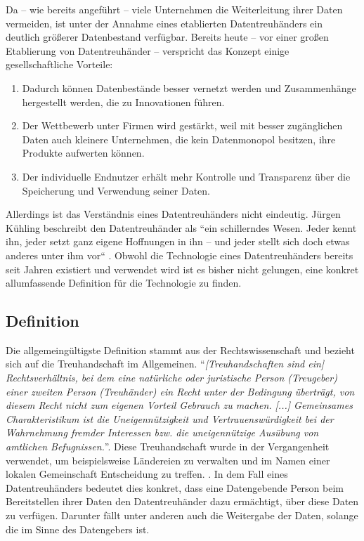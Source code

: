 \documentclass[
	fontsize=12pt,
	headings=small,
	parskip=half,           %
	bibliography=totoc,
	numbers=noenddot,       %
	open=any,               %
]{scrreprt}
\begin{document}
Da -- wie bereits angeführt -- viele Unternehmen die Weiterleitung ihrer Daten vermeiden, ist unter der Annahme eines etablierten Datentreuhänders ein deutlich größerer Datenbestand verfügbar. Bereits heute -- vor einer großen Etablierung von Datentreuhänder -- verspricht das Konzept einige gesellschaftliche Vorteile: \cite{dt-richter2020ddvtalk}
\begin{enumerate}
    \item Dadurch können Datenbestände besser vernetzt werden und Zusammenhänge hergestellt werden, die zu Innovationen führen.
    \item Der Wettbewerb unter Firmen wird gestärkt, weil mit besser zugänglichen Daten auch kleinere Unternehmen, die kein Datenmonopol besitzen, ihre Produkte aufwerten können.
    \item Der individuelle Endnutzer erhält mehr Kontrolle und Transparenz über die Speicherung und Verwendung seiner Daten.
\end{enumerate}

Allerdings ist das Verständnis eines Datentreuhänders nicht eindeutig. Jürgen Kühling beschreibt den Datentreuhänder als ``ein schillerndes Wesen. Jeder kennt ihn, jeder setzt ganz eigene Hoffnungen in ihn – und jeder stellt sich doch etwas anderes unter ihm vor`` \cite{dt-kuhling2021datentreuhander}. Obwohl die Technologie eines Datentreuhänders bereits seit Jahren existiert und verwendet wird \cite{dt-hardinges2018data} ist es bisher nicht gelungen, eine konkret allumfassende Definition für die Technologie zu finden.

\subsection{Definition}
Die allgemeingültigste Definition stammt aus der Rechtswissenschaft und bezieht sich auf die Treuhandschaft im Allgemeinen. ``\textit{[Treuhandschaften sind ein] Rechtsverhältnis, bei dem eine natürliche oder juristische Person (Treugeber) einer zweiten Person (Treuhänder) ein Recht unter der Bedingung überträgt, von diesem Recht nicht zum eigenen Vorteil Gebrauch zu machen. [...] Gemeinsames Charakteristikum ist die Uneigennützigkeit und Vertrauenswürdigkeit bei der Wahrnehmung fremder Interessen bzw. die uneigennützige Ausübung von amtlichen Befugnissen.}''\cite{dt-beeck2013treuhandschaft}. Diese Treuhandschaft wurde in der Vergangenheit verwendet, um beispielsweise Ländereien zu verwalten und im Namen einer lokalen Gemeinschaft Entscheidung zu treffen. \cite{dt-hardinges2018data}. In dem Fall eines Datentreuhänders bedeutet dies konkret, dass eine Datengebende Person beim Bereitstellen ihrer Daten den Datentreuhänder dazu ermächtigt, über diese Daten zu verfügen. Darunter fällt unter anderen auch die Weitergabe der Daten, solange die im Sinne des Datengebers ist. 
\end{document}
